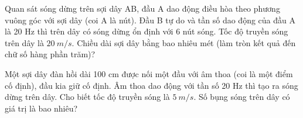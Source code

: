 \begin{ex}
Quan sát sóng dừng trên sợi dây AB, đầu A dao động điều hòa theo phương vuông góc với sợi dây (coi A là nút). Đầu B tự do và tần số dao động của đầu A là 20 Hz thì trên dây có sóng dừng ổn định với 6 nút sóng. Tốc độ truyền sóng trên dây là $20 \ m/s$. Chiều dài sợi dây bằng bao nhiêu mét (làm tròn kết quả đến chữ số hàng phần trăm)?
\loigiai{

}
\end{ex}
\begin{ex}
Một sợi dây đàn hồi dài 100 cm được nối một đầu với âm thoa (coi là một điểm cố định), đầu kia giữ cố định. Âm thoa dao động với tần số 20 Hz thì tạo ra sóng dừng trên dây. Cho biết tốc độ truyền sóng là $5 \ m/s$. Số bụng sóng trên dây có giá trị là bao nhiêu?
\end{ex}